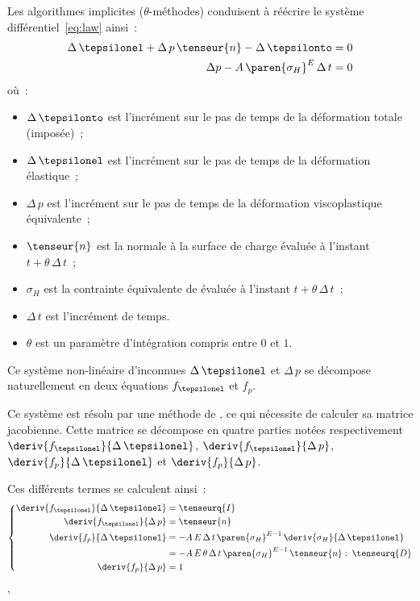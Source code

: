\documentclass[rectoverso,pleiades,pstricks,leqno,anti]{texmf/note_technique_2010}
\newcommand{\sigmaH}{\ensuremath{\sigma_{H}}}
\begin{document}
Les algorithmes implicites (\(\theta\)-méthodes) conduisent à réécrire
le système différentiel~\eqref{eq:law} ainsi~:
\begin{equation}
  \begin{aligned}
    \Delta\,\tepsilonel + \Delta\,p\,\tenseur{n} - \Delta\,\tepsilonto &= 0 \\
    \Delta{p}   - A\,\paren{\sigmaH}^{E}\,\Delta\, t &= 0 \\
  \end{aligned}
\end{equation}
où~:
\begin{minipage}[t]{0.8\linewidth}
  \begin{itemize}
  \item \(\Delta\,\tepsilonto\) est l'incrément sur le pas de temps de
    la déformation totale (imposée)~;
  \item \(\Delta\,\tepsilonel\) est l'incrément sur le pas de temps de
    la déformation élastique~;
  \item \(\Delta\,p\) est l'incrément sur le pas de temps de la
    déformation viscoplastique équivalente~;
  \item \(\tenseur{n}\) est la normale à la surface de charge évaluée
    à l'instant \(t+\theta\,\Delta\,t\)~;
  \item \(\sigmaH\) est la contrainte équivalente de 
    évaluée à l'instant \(t+\theta\,\Delta\,t\)~;
  \item \(\Delta\,t\) est l'incrément de temps.
  \item \(\theta\) est un paramètre d'intégration compris entre \(0\)
    et \(1\).
  \end{itemize}
\end{minipage}

Ce système non-linéaire d'inconnues \(\Delta\,\tepsilonel\) et
\(\Delta\,p\) se décompose naturellement en deux équations
\(f_{\tepsilonel}\) et \(f_{p}\).

Ce système est résolu par une méthode de , ce qui
nécessite de calculer sa matrice jacobienne. Cette matrice se décompose
en quatre parties notées respectivement
\(\deriv{f_{\tepsilonel}}{\Delta\,\tepsilonel}\),
\(\deriv{f_{\tepsilonel}}{\Delta\,p}\),
\(\deriv{f_{p}}{\Delta\,\tepsilonel}\) et \(\deriv{f_{p}}{\Delta\,p}\).

Ces différents termes se calculent ainsi~:
\[
\left\{
\begin{aligned}
  \deriv{f_{\tepsilonel}}{\Delta\,\tepsilonel} &= \tenseurq{I} \\
  \deriv{f_{\tepsilonel}}{\Delta\,p} &= \tenseur{n} \\
  \deriv{f_{p}}{\Delta\,\tepsilonel} &= - A\,E\,\Delta\, t\,\paren{\sigmaH}^{E-1}\,\deriv{\sigmaH}{\Delta\,\tepsilonel} \\
  &= - A\,E\,\theta\,\Delta\, t\,\paren{\sigmaH}^{E-1}\,\tenseur{n}\,\colon\,\tenseurq{D} \\
  \deriv{f_{p}}{\Delta\,p} &= 1
\end{aligned}
\right.
\],
\end{document}
